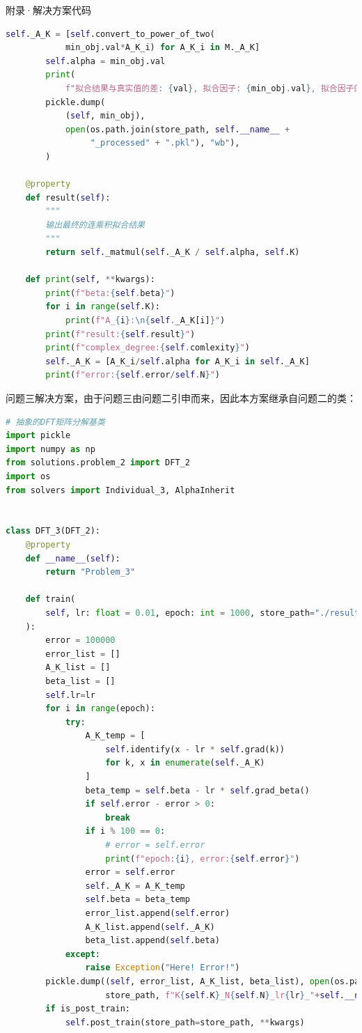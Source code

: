 \documentclass[11pt]{article}
\begin{document}
\begin{section}{附录·解决方案代码}
\begin{lstlisting}[language=Python]
        self._A_K = [self.convert_to_power_of_two(
            min_obj.val*A_K_i) for A_K_i in M._A_K]
        self.alpha = min_obj.val
        print(
            f"拟合结果与真实值的差: {val}, 拟合因子: {min_obj.val}, 拟合因子的标准差: {min_obj.sigma}")
        pickle.dump(
            (self, min_obj),
            open(os.path.join(store_path, self.__name__ +
                 "_processed" + ".pkl"), "wb"),
        )

    @property
    def result(self):
        """
        输出最终的连乘积拟合结果
        """
        return self._matmul(self._A_K / self.alpha, self.K)

    def print(self, **kwargs):
        print(f"beta:{self.beta}")
        for i in range(self.K):
            print(f"A_{i}:\n{self._A_K[i]}")
        print(f"result:{self.result}")
        print(f"complex_degree:{self.comlexity}")
        self._A_K = [A_K_i/self.alpha for A_K_i in self._A_K]
        print(f"error:{self.error/self.N}")

 \end{lstlisting}
 问题三解决方案，由于问题三由问题二引申而来，因此本方案继承自问题二的类：
 \begin{lstlisting}[language=Python]
  # 抽象的DFT矩阵分解基类
import pickle
import numpy as np
from solutions.problem_2 import DFT_2
import os
from solvers import Individual_3, AlphaInherit


class DFT_3(DFT_2):
    @property
    def __name__(self):
        return "Problem_3"

    def train(
        self, lr: float = 0.01, epoch: int = 1000, store_path="./result/Problem_3.pkl", is_post_train: bool = False, **kwargs
    ):
        error = 100000
        error_list = []
        A_K_list = []
        beta_list = []
        self.lr=lr
        for i in range(epoch):
            try:
                A_K_temp = [
                    self.identify(x - lr * self.grad(k))
                    for k, x in enumerate(self._A_K)
                ]
                beta_temp = self.beta - lr * self.grad_beta()
                if self.error - error > 0:
                    break
                if i % 100 == 0:
                    # error = self.error
                    print(f"epoch:{i}, error:{self.error}")
                error = self.error
                self._A_K = A_K_temp
                self.beta = beta_temp
                error_list.append(self.error)
                A_K_list.append(self._A_K)
                beta_list.append(self.beta)
            except:
                raise Exception("Here! Error!")
        pickle.dump((self, error_list, A_K_list, beta_list), open(os.path.join(
                    store_path, f"K{self.K}_N{self.N}_lr{lr}_"+self.__name__+".pkl"), "wb"))
        if is_post_train:
            self.post_train(store_path=store_path, **kwargs)


\end{lstlisting}
\end{section}
\end{document}
